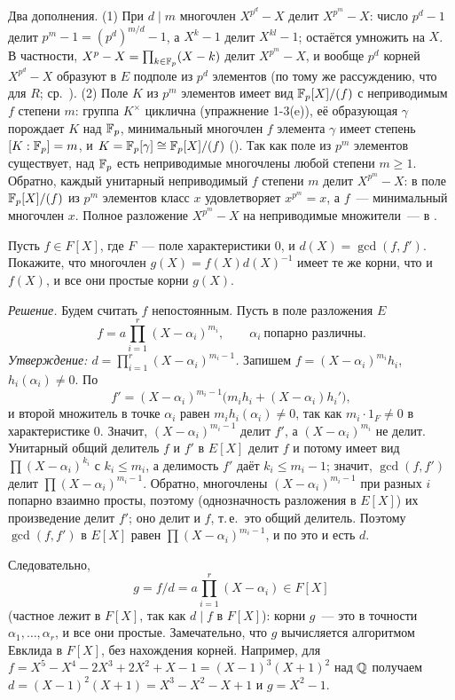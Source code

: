 Два дополнения. (1) При $d\mid m$ многочлен $X^{p^d}-X$ делит $X^{p^m}-X$: число $p^d-1$ делит $p^m-1=(p^d)^{m/d}-1$, а
$X^k-1$ делит $X^{kl}-1$; остаётся умножить на $X$. В частности, $X^p-X=\prod_{k\in\mathbb F_p}(X-k)$ делит $X^{p^m}-X$, и
вообще $p^d$ корней $X^{p^d}-X$ образуют в $E$ подполе из $p^d$ элементов (по тому же рассуждению, что для $R$; ср.\
). (2) Поле $K$ из $p^m$ элементов имеет вид $\mathbb F_p[X]/(f)$ с неприводимым $f$ степени $m$: группа $K^\times$
циклична (упражнение 1-3(e)), её образующая $\gamma$ порождает $K$ над $\mathbb F_p$, минимальный многочлен $f$ элемента
$\gamma$ имеет степень $[K:\mathbb F_p]=m$, и $K=\mathbb F_p[\gamma]\cong\mathbb F_p[X]/(f)$ (\rf{1.27c}). Так как поле из $p^m$ элементов
существует, над $\mathbb F_p$ есть неприводимые многочлены любой степени $m\ge1$. Обратно, каждый унитарный неприводимый $f$
степени $m$ делит $X^{p^m}-X$: в поле $\mathbb F_p[X]/(f)$ из $p^m$ элементов класс $x$ удовлетворяет $x^{p^m}=x$, а $f$~---
минимальный многочлен $x$. Полное разложение $X^{p^m}-X$ на неприводимые множители~--- в \rf{4.22b}.

\begin{exercise}[2-5]
Пусть $f\in F[X]$, где $F$~--- поле характеристики $0$, и $d(X)=\gcd(f,f')$. Покажите, что многочлен
$g(X)=f(X)d(X)^{-1}$ имеет те же корни, что и $f(X)$, и все они простые корни $g(X)$.
\end{exercise}

\noindent\emph{Решение.} Будем считать $f$ непостоянным. Пусть в поле разложения $E$
\[
f=a\prod_{i=1}^r(X-\alpha_i)^{m_i},\qquad \alpha_i\ \text{попарно различны}.
\]
\emph{Утверждение: $d=\prod_{i=1}^r(X-\alpha_i)^{m_i-1}$.} Запишем $f=(X-\alpha_i)^{m_i}h_i$, $h_i(\alpha_i)\ne0$. По
\rf{2.18a}
\[
f'=(X-\alpha_i)^{m_i-1}\bigl(m_ih_i+(X-\alpha_i)h_i'\bigr),
\]
и второй множитель в точке $\alpha_i$ равен $m_ih_i(\alpha_i)\ne0$, так как $m_i\cdot1_F\ne0$ в характеристике $0$.
Значит, $(X-\alpha_i)^{m_i-1}$ делит $f'$, а $(X-\alpha_i)^{m_i}$ не делит. Унитарный общий делитель $f$ и $f'$ в $E[X]$
делит $f$ и потому имеет вид $\prod(X-\alpha_i)^{k_i}$ с $k_i\le m_i$, а делимость $f'$ даёт $k_i\le m_i-1$; значит, $\gcd(f,f')$ делит $\prod(X-\alpha_i)^{m_i-1}$. Обратно,
многочлены $(X-\alpha_i)^{m_i-1}$ при разных $i$ попарно взаимно просты, поэтому (однозначность разложения в $E[X]$) их
произведение делит $f'$; оно делит и $f$, т.\,е.\ это общий делитель. Поэтому
$\gcd(f,f')$ в $E[X]$ равен $\prod(X-\alpha_i)^{m_i-1}$, и по \rf{2.17} это и есть $d$.

Следовательно,
\[
g=f/d=a\prod_{i=1}^r(X-\alpha_i)\in F[X]
\]
(частное лежит в $F[X]$, так как $d\mid f$ в $F[X]$): корни $g$~--- это в точности $\alpha_1,\dots,\alpha_r$, и все они
простые. Замечательно, что $g$ вычисляется алгоритмом Евклида в $F[X]$, без нахождения корней. Например, для
$f=X^5-X^4-2X^3+2X^2+X-1=(X-1)^3(X+1)^2$ над $\mathbb Q$ получаем $d=(X-1)^2(X+1)=X^3-X^2-X+1$ и $g=X^2-1$.

